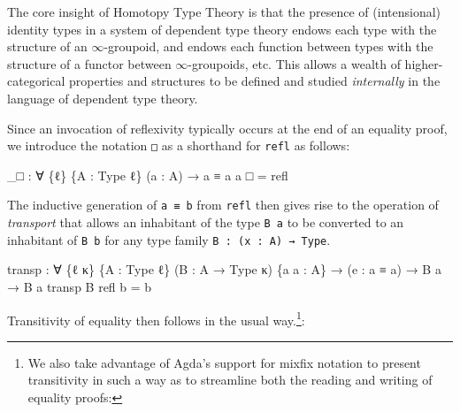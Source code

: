 \documentclass[
  11pt,
  oneside,
  article]{memoir}
\newenvironment{Shaded}{}{}
\newcommand{\NormalTok}[1]{#1}
\newcommand{\OtherTok}[1]{\textcolor[rgb]{0.00,0.44,0.13}{#1}}
\theoremstyle{definition}
\theoremstyle{plain}
\newcommand{\0}{\textsf{0}}
\newcommand{\1}{\tn{\textsf{1}}}
\begin{document}
The core insight of Homotopy Type Theory \cite{Voevodsky:2013a} is that
the presence of (intensional) identity types in a system of dependent
type theory endows each type with the structure of an
\(\infty\)-groupoid, and endows each function between types with the
structure of a functor between \(\infty\)-groupoids, etc. This allows a
wealth of higher-categorical properties and structures to be defined and
studied \emph{internally} in the language of dependent type theory.

Since an invocation of reflexivity typically occurs at the end of an
equality proof, we introduce the notation \texttt{□} as a shorthand for
\texttt{refl} as follows:

\begin{Shaded}
\begin{Highlighting}[]
\OtherTok{\_}\NormalTok{□ }\OtherTok{:} \OtherTok{∀} \OtherTok{\{}\NormalTok{ℓ}\OtherTok{\}} \OtherTok{\{}\NormalTok{A }\OtherTok{:}\NormalTok{ Type ℓ}\OtherTok{\}} \OtherTok{(}\NormalTok{a }\OtherTok{:}\NormalTok{ A}\OtherTok{)} \OtherTok{→}\NormalTok{ a ≡ a}
\NormalTok{a □ }\OtherTok{=}\NormalTok{ refl}
\end{Highlighting}
\end{Shaded}

The inductive generation of \texttt{a\ ≡\ b} from \texttt{refl} then
gives rise to the operation of \emph{transport} that allows an
inhabitant of the type \texttt{B\ a} to be converted to an inhabitant of
\texttt{B\ b} for any type family \texttt{B\ :\ (x\ :\ A)\ →\ Type}.

\begin{Shaded}
\begin{Highlighting}[]
\NormalTok{transp }\OtherTok{:} \OtherTok{∀} \OtherTok{\{}\NormalTok{ℓ κ}\OtherTok{\}} \OtherTok{\{}\NormalTok{A }\OtherTok{:}\NormalTok{ Type ℓ}\OtherTok{\}} \OtherTok{(}\NormalTok{B }\OtherTok{:}\NormalTok{ A }\OtherTok{→}\NormalTok{ Type κ}\OtherTok{)} \OtherTok{\{}\NormalTok{a a\textquotesingle{} }\OtherTok{:}\NormalTok{ A}\OtherTok{\}} 
         \OtherTok{→} \OtherTok{(}\NormalTok{e }\OtherTok{:}\NormalTok{ a ≡ a\textquotesingle{}}\OtherTok{)} \OtherTok{→}\NormalTok{ B a }\OtherTok{→}\NormalTok{ B a\textquotesingle{}}
\NormalTok{transp B refl b }\OtherTok{=}\NormalTok{ b}
\end{Highlighting}
\end{Shaded}

Transitivity of equality then follows in the usual way.\footnote{We also
  take advantage of Agda's support for mixfix notation to present
  transitivity in such a way as to streamline both the reading and
  writing of equality proofs:}:
\end{document}
